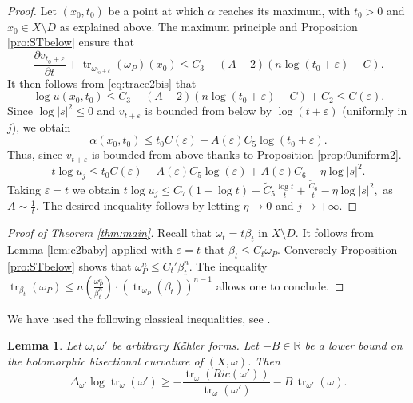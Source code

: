 \documentclass[10pt,a4paper]{amsart}
\numberwithin{equation}{section}
\newtheorem{lem}[theorem]{Lemma}
\newcommand{\R}{\mathbb R}
\newcommand \e {\varepsilon}
\newcommand{\tr}{\operatorname{tr}}
\begin{document}
\begin{proof}
Let $(x_0, t_0)$ be a point at which $\alpha$ reaches its maximum,
with $t_0>0$ and $x_0 \in X \setminus D$ as explained above.
The maximum principle and Proposition \ref{pro:STbelow} ensure that 
$$ 
\frac{\partial v_{t_0+\e}}{\partial t}  + \tr_{\omega_{t_0+\varepsilon}}(\omega_P)(x_0)\leq C_3-(A-2)(n\log (t_0+\varepsilon)-C). 
$$  
It then follows from \eqref{eq:trace2bis} that
$$
\log u(x_0, t_0) \leq  C_3-(A-2)(n\log (t_0+\varepsilon)-C) +C_2
\leq  C(\varepsilon).
$$ 
Since $\log|s|^2 \leq 0$ and $v_{t+\varepsilon}$ is bounded from below by $ \log (t+\varepsilon) $ (uniformly in $j$),  
we obtain 
$$
\alpha (x_0, t_0)\leq t_0  C(\varepsilon) -A(\varepsilon)C_5 \log (t_0+\varepsilon).
$$
Thus, since $v_{t+\varepsilon}$ is bounded from above thanks to Proposition \ref{prop:0uniform2}.
$$
t\log u_j \leq  t_0 C(\varepsilon)  -A(\varepsilon)C_5 \log (\varepsilon)+A(\varepsilon)C_6 -\eta \log|s|^2.
$$
Taking $\varepsilon=t$ we obtain
$
t\log u_j \leq  C_7 (1-\log t)  -\tilde{C}_5 \frac{\log t}{t}+\frac{\tilde{C}_6}{t} -\eta \log|s|^2,
$
as $A\sim \frac{1}{t}$.
The desired inequality follows  by letting $\eta \to 0$ and $j \rightarrow +\infty$. 
\end{proof}

 
  

 
 
\begin{proof}[Proof of Theorem \ref{thm:main}]
Recall that $\omega_t=t \beta_t$ in $X \setminus D$.
It follows from Lemma \ref{lem:c2baby} applied with $\e=t$ that $\beta_t \leq C_t \omega_P$.
Conversely Proposition \ref{pro:STbelow} shows that $\omega_P^n \leq C_t'  \beta_t^n $.
The inequality
$
\tr_{\beta_t}(\omega_P)
\leq n \left( \frac{\omega_P^n}{\beta_t^n} \right) \cdot \left( \tr_{\omega_P} (\beta_t) \right)^{n-1}
$
allows one to conclude.
\end{proof}

 



 We have used the following classical  inequalities, see \cite{Siu87}.
 
 \begin{lem} \label{lem:Siu}
Let $\omega,\omega'$ be arbitrary K\"ahler forms.
Let $-B \in \R$ be a lower bound on the holomorphic bisectional curvature of $(X,\omega)$. Then
$$
\Delta_{\omega'} \log \tr_{\omega} (\omega') \geq -\frac{\tr_{\omega}(Ric(\omega'))}{\tr_{\omega}(\omega')}
-B \,  \tr_{\omega'}(\omega).
$$
\end{lem}
 
 
\end{document}
